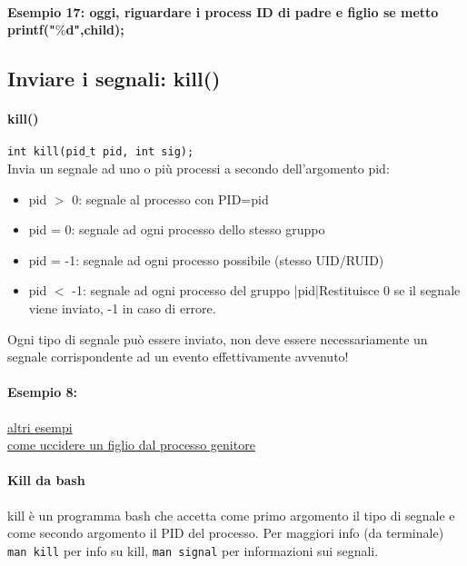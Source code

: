 \paragraph{Esempio 17: oggi, riguardare i process ID di padre e figlio se metto printf("$\%$d",child);}\hfill \break


\subsection{Inviare i segnali: kill()}

\paragraph{kill()} 
\texttt{int kill(pid$\_$t pid, int sig);}\\
Invia un segnale ad uno o più processi a secondo dell'argomento pid:
\begin{itemize}
    \item pid $>$ 0: segnale al processo con PID=pid
    \item pid = 0: segnale ad ogni processo dello stesso gruppo
    \item pid = -1: segnale ad ogni processo possibile (stesso UID/RUID)
    \item pid $<$ -1: segnale ad ogni processo del gruppo |pid|Restituisce 0 se il segnale viene inviato, -1 in caso di errore.
\end{itemize}
Ogni tipo di segnale può essere inviato, non deve essere necessariamente un segnale corrispondente ad un evento effettivamente avvenuto!
\paragraph{Esempio 8:}\hfill \break


\href{https://aljensencprogramming.wordpress.com/2014/05/15/the-kill-function-in-c/}{altri esempi} \\
\href{https://stackoverflow.com/questions/6501522/how-to-kill-a-child-process-by-the-parent-process}{come uccidere un figlio dal processo genitore}
\paragraph{Kill da bash} kill è un programma bash che accetta come primo argomento il tipo di segnale e come secondo argomento il PID del processo. Per maggiori info (da terminale) \texttt{man kill} per info su kill, \texttt{man signal} per informazioni sui segnali.\\
